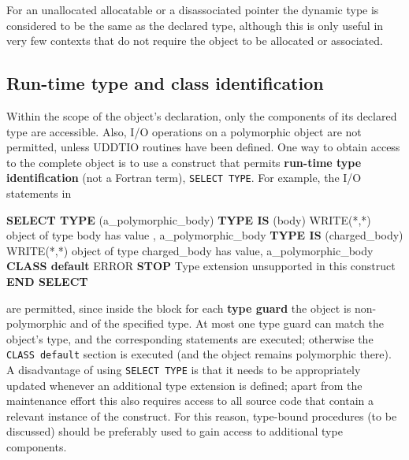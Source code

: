 \documentclass[
]{article}
\newenvironment{Shaded}{}{}
\newcommand{\FunctionTok}[1]{\textcolor[rgb]{0.02,0.16,0.49}{#1}}
\newcommand{\KeywordTok}[1]{\textcolor[rgb]{0.00,0.44,0.13}{\textbf{#1}}}
\newcommand{\NormalTok}[1]{#1}
\newcommand{\StringTok}[1]{\textcolor[rgb]{0.25,0.44,0.63}{#1}}
\begin{document}
For an unallocated allocatable or a disassociated pointer the dynamic
type is considered to be the same as the declared type, although this is
only useful in very few contexts that do not require the object to be
allocated or associated.

\subsection{Run-time type and class
identification}\label{run-time-type-and-class-identification}

Within the scope of the object's declaration, only the components of its
declared type are accessible. Also, I/O operations on a polymorphic
object are not permitted, unless UDDTIO routines have been defined. One
way to obtain access to the complete object is to use a construct that
permits \textbf{run-time type identification} (not a Fortran term),
\texttt{SELECT\ TYPE}. For example, the I/O statements in

\begin{Shaded}
\begin{Highlighting}[]
\KeywordTok{SELECT TYPE}\NormalTok{ (a\_polymorphic\_body)}
\KeywordTok{TYPE IS}\NormalTok{ (body)}
   \FunctionTok{WRITE(*}\NormalTok{,}\FunctionTok{*)} \StringTok{\textquotesingle{}object of type body has value        \textquotesingle{}}\NormalTok{, a\_polymorphic\_body}
\KeywordTok{TYPE IS}\NormalTok{ (charged\_body)}
   \FunctionTok{WRITE(*}\NormalTok{,}\FunctionTok{*)} \StringTok{\textquotesingle{}object of type charged\_body has value\textquotesingle{}}\NormalTok{, a\_polymorphic\_body}
\KeywordTok{CLASS default}
\NormalTok{   ERROR }\KeywordTok{STOP} \StringTok{\textquotesingle{}Type extension unsupported in this construct\textquotesingle{}}
\KeywordTok{END SELECT}
\end{Highlighting}
\end{Shaded}

are permitted, since inside the block for each \textbf{type guard} the
object is non-polymorphic and of the specified type. At most one type
guard can match the object's type, and the corresponding statements are
executed; otherwise the \texttt{CLASS\ default} section is executed (and
the object remains polymorphic there). A disadvantage of using
\texttt{SELECT\ TYPE} is that it needs to be appropriately updated
whenever an additional type extension is defined; apart from the
maintenance effort this also requires access to all source code that
contain a relevant instance of the construct. For this reason,
type-bound procedures (to be discussed) should be preferably used to
gain access to additional type components.
\end{document}
